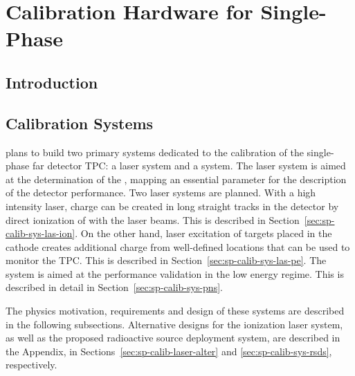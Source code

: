 \chapter{Calibration Hardware for Single-Phase}
\label{ch:sp-calib}



\section{Introduction}
\label{sec:sp-calib-ov}




\section{Calibration Systems}

 plans to build two primary systems dedicated to the calibration of the single-phase far detector TPC: a laser system
and a  system. The laser system is aimed at the determination of the \efield, mapping an essential parameter for the description of the detector performance. Two laser systems are planned. With a high intensity laser, charge can be created in long straight tracks in the detector by direct ionization of  with the laser beams. This is described in Section~\ref{sec:sp-calib-sys-las-ion}. On the other hand, laser excitation of targets placed in the cathode creates additional charge from well-defined locations that can be used to monitor the TPC. This is described in Section~\ref{sec:sp-calib-sys-las-pe}. The  system is aimed at the performance validation in the low energy regime. This is described in detail in Section~\ref{sec:sp-calib-sys-pns}.

The physics motivation, requirements and design of these systems are described in the following subsections. Alternative designs
for the ionization laser system, as well as the proposed radioactive source deployment system, are described in the Appendix, in Sections~\ref{sec:sp-calib-laser-alter} and \ref{sec:sp-calib-sys-rsds}, respectively.


